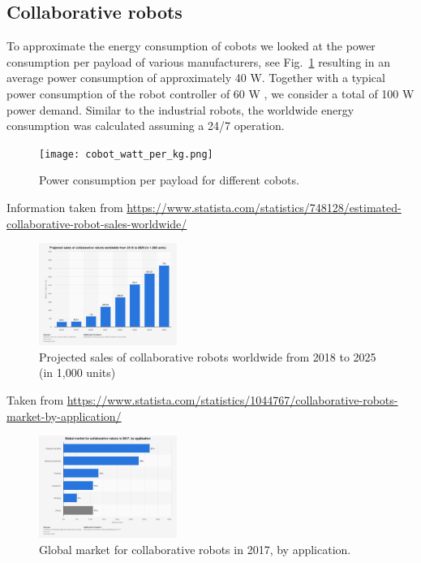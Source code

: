 \begin{appendices}
\section{Collaborative robots}\label{sec:app_cobot_ener_consumption}
To approximate the energy consumption of cobots we looked at the power consumption per payload of various manufacturers, see Fig.~\ref{fig:cobot_watt_per_kg} resulting in an average power consumption of approximately 40 W. Together with a typical power consumption of the robot controller of 60 W \cite{Heredia2023BreakingEnergyConsumption}, we consider a total of 100 W power demand. Similar to the industrial robots, the worldwide energy consumption was calculated assuming a 24/7 operation.
\begin{figure}[h]
	\centering
	\texttt{[image: cobot\_watt\_per\_kg.png]}
	\caption{Power consumption per payload for different cobots.}
	\label{fig:cobot_watt_per_kg}
\end{figure}
Information taken from \url{https://www.statista.com/statistics/748128/estimated-collaborative-robot-sales-worldwide/}
\begin{figure}[!ht]
	\centering
	\includegraphics[width=0.4\textwidth]{fig/cobots_global_sales_2018_2025}
	\caption{Projected sales of collaborative robots worldwide from 2018 to 2025 (in 1,000 units)}
	\label{fig:cobots_sales_projection}
\end{figure}

Taken from \url{https://www.statista.com/statistics/1044767/collaborative-robots-market-by-application/}
\begin{figure}[!ht]
	\centering
	\includegraphics[width=0.4\textwidth]{fig/global_market_size_cobots_by_application}
	\caption{Global market for collaborative robots in 2017, by application.}
	\label{fig:global_market_size_cobots_by_application}
\end{figure}


\end{appendices}
